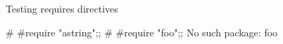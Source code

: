 Testing requires directives

\begin{ocaml}
# #require "astring";;
# #require "foo";;
No such package: foo
\end{ocaml}
